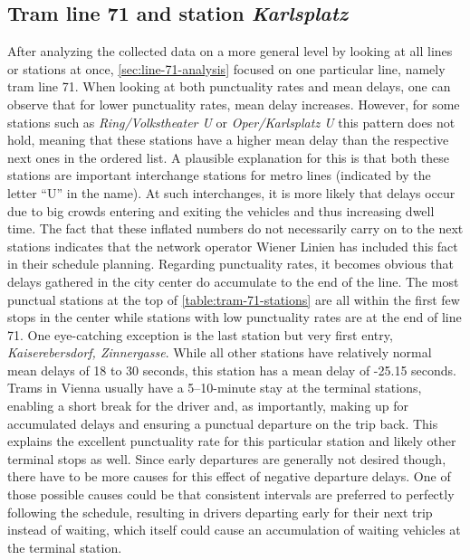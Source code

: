 \subsection{Tram line 71 and station \textit{Karlsplatz}}

After analyzing the collected data on a more general level by looking at all lines or stations at once, \cref{sec:line-71-analysis} focused on one particular line, namely tram line 71. When looking at both punctuality rates and mean delays, one can observe that for lower punctuality rates, mean delay increases. However, for some stations such as \textit{Ring/Volkstheater U} or \textit{Oper/Karlsplatz U} this pattern does not hold, meaning that these stations have a higher mean delay than the respective next ones in the ordered list. A plausible explanation for this is that both these stations are important interchange stations for metro lines (indicated by the letter \enquote{U} in the name). At such interchanges, it is more likely that delays occur due to big crowds entering and exiting the vehicles and thus increasing dwell time. The fact that these inflated numbers do not necessarily carry on to the next stations indicates that the network operator Wiener Linien has included this fact in their schedule planning. Regarding punctuality rates, it becomes obvious that delays gathered in the city center do accumulate to the end of the line. The most punctual stations at the top of \cref{table:tram-71-stations} are all within the first few stops in the center while stations with low punctuality rates are at the end of line 71. One eye-catching exception is the last station but very first entry, \textit{Kaiserebersdorf, Zinnergasse}. While all other stations have relatively normal mean delays of 18 to 30 seconds, this station has a mean delay of -25.15 seconds. Trams in Vienna usually have a 5--10-minute stay at the terminal stations, enabling a short break for the driver and, as importantly, making up for accumulated delays and ensuring a punctual departure on the trip back. This explains the excellent punctuality rate for this particular station and likely other terminal stops as well. Since early departures are generally not desired though, there have to be more causes for this effect of negative departure delays. One of those possible causes could be that consistent intervals are preferred to perfectly following the schedule, resulting in drivers departing early for their next trip instead of waiting, which itself could cause an accumulation of waiting vehicles at the terminal station.


